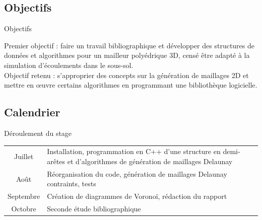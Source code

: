 \documentclass[aspectratio=169, 12pt, a4paper, hyperref={pdfauthor={Alexandre MARIN}, pdfkeywords={IFPEN, Delaunay, Voronoi, mesh generation}, colorlinks=true, linkcolor=purple, urlcolor=blue, citecolor=magenta}]{beamer}
\begin{document}
\subsection{Objectifs}
\begin{Energie}{Objectifs}

Premier objectif : faire un travail bibliographique et développer des structures de données et algorithmes pour un mailleur polyédrique 3D, censé être adapté à la simulation d'écoulements dans le sous-sol.
\\[1cm]
Objectif retenu : s'approprier des concepts sur la génération de maillages 2D et mettre en \oe{}uvre certains algorithmes en programmant une bibliothèque logicielle.
\end{Energie}

\subsection{Calendrier}
\begin{Energie}{Déroulement du stage}
{\renewcommand{\arraystretch}{1.5}
\renewcommand{\tabcolsep}{0.2cm}
\begin{tabular}{c|p{12cm}}
Juillet & Installation, programmation en C++ d'une structure en demi-arêtes et d'algorithmes de génération de maillages Delaunay\\
Août & Réorganisation du code, génération de maillages Delaunay contraints, tests\\
Septembre & Création de diagrammes de Voronoï, rédaction du rapport\\
Octobre & Seconde étude bibliographique\\
\end{tabular}}
\end{Energie}
\end{document}
